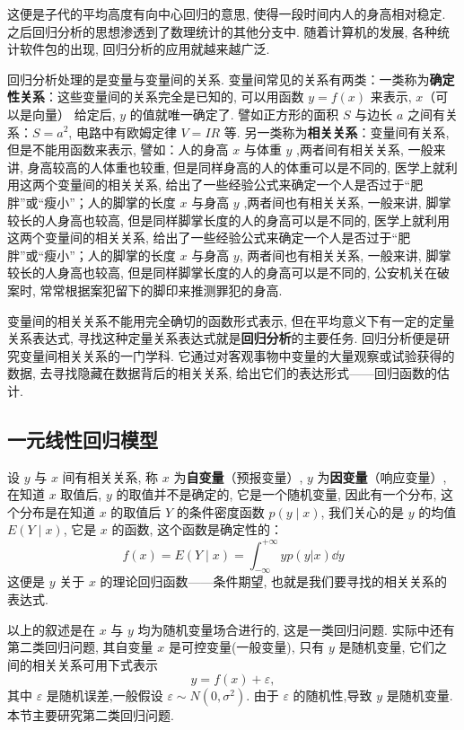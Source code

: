 这便是子代的平均高度有向中心回归的意思, 使得一段时间内人的身高相对稳定. 之后回归分析的思想渗透到了数理统计的其他分支中. 随着计算机的发展, 各种统计软件包的出现, 回归分析的应用就越来越广泛.

回归分析处理的是变量与变量间的关系. 变量间常见的关系有两类：一类称为\textbf{确定性关系}：这些变量间的关系完全是已知的, 可以用函数 $y = f(x)$ 来表示, $x$（可以是向量） 给定后, $y$ 的值就唯一确定了. 譬如正方形的面积 $S$ 与边长 $a$ 之间有关系：$S = a^{2}$, 电路中有欧姆定律 $V = IR$ 等. 另一类称为\textbf{相关关系}：变量间有关系, 但是不能用函数来表示, 譬如：人的身高 $x$ 与体重 $y$ ,两者间有相关关系, 一般来讲, 身高较高的人体重也较重, 但是同样身高的人的体重可以是不同的, 医学上就利用这两个变量间的相关关系, 给出了一些经验公式来确定一个人是否过于“肥胖”或“瘦小”；人的脚掌的长度 $x$ 与身高 $y$ ,两者间也有相关关系, 一般来讲, 脚掌较长的人身高也较高, 但是同样脚掌长度的人的身高可以是不同的, 医学上就利用这两个变量间的相关关系, 给出了一些经验公式来确定一个人是否过于“肥胖”或“瘦小”；人的脚掌的长度 $x$ 与身高 $y$, 两者间也有相关关系, 一般来讲, 脚掌较长的人身高也较高, 但是同样脚掌长度的人的身高可以是不同的, 公安机关在破案时, 常常根据案犯留下的脚印来推测罪犯的身高.

变量间的相关关系不能用完全确切的函数形式表示, 但在平均意义下有一定的定量关系表达式, 寻找这种定量关系表达式就是\textbf{回归分析}的主要任务. 回归分析便是研究变量间相关关系的一门学科. 它通过对客观事物中变量的大量观察或试验获得的数据, 去寻找隐藏在数据背后的相关关系, 给出它们的表达形式——回归函数的估计.

\subsection{一元线性回归模型}\label{ssec:8.4.2}

设 $y$ 与 $x$ 间有相关关系, 称 $x$ 为\textbf{自变量}（预报变量）, $y$ 为\textbf{因变量}（响应变量）, 在知道 $x$ 取值后, $y$ 的取值并不是确定的, 它是一个随机变量, 因此有一个分布, 这个分布是在知道 $x$ 的取值后 $Y$ 的条件密度函数 $p(y \mid x)$, 我们关心的是 $y$ 的均值 $E(Y \mid x)$, 它是 $x$ 的函数, 这个函数是确定性的：
\begin{equation}
  f(x) = E(Y \mid x) = \int_{-\infty}^{+\infty} y p(y \vert x) \dd y
\end{equation}
这便是 $y$ 关于 $x$ 的理论回归函数——条件期望, 也就是我们要寻找的相关关系的表达式.

以上的叙述是在 $x$ 与 $y$ 均为随机变量场合进行的, 这是一类回归问题. 实际中还有第二类回归问题, 其自变量 $x$ 是可控变量(一般变量), 只有 $ y$ 是随机变量, 它们之间的相关关系可用下式表示
\begin{equation*}
  y = f(x) + \varepsilon,
\end{equation*}
其中 $\varepsilon$ 是随机误差,一般假设 $\varepsilon \sim N(0,\sigma^2)$. 由于 $\varepsilon$ 的随机性,导致 $y$ 是随机变量. 本节主要研究第二类回归问题.

